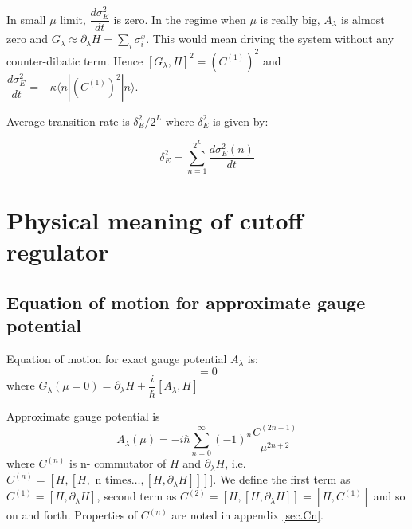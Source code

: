 \documentclass[11pt,a4paper]{article}
\begin{document}
In small $\mu$ limit,  $ \dfrac{d \sigma^2_E}{dt}$ is zero. In  the regime when $\mu$ is really big, $A_{\lambda}$ is almost zero and  $ G_{\lambda} \approx \partial_{\lambda} H = \sum_i \sigma_i^x$.  This would mean driving the system without any counter-dibatic term. Hence $[G_{\lambda}, H]^2= (C^{(1)}) ^2$ and $\dfrac{d \sigma^2_E}{dt}=-\kappa \langle n|(C^{(1)})^2 |n \rangle $.

Average transition rate is $\delta_E^2/2^L$ where $\delta_E^2$ is given by:

\begin{equation}
\delta_E^2= \sum_{n=1}^{2^L}\dfrac{d \sigma^2_E (n)}{dt}
\end{equation}

\section{Physical meaning of cutoff regulator}
\subsection{Equation of motion for approximate gauge potential}
Equation of motion for exact gauge potential $A_{\lambda}$  is:
\begin{equation}
[H, G_{\lambda}(\mu=0)]=0
\end{equation}
where $G_{\lambda}(\mu=0)= \partial_{\lambda} H + \dfrac{i}{\hbar} [A_{\lambda}, H] $ 



Approximate gauge potential is 
\begin{equation}
 A_{\lambda}(\mu) =  -i\hbar \sum_{n=0}^{\infty}   (-1)^{n} \dfrac{ C^{(2n+1)}}{\mu^{2n+2}}
\end{equation}
where $C^{(n)}$ is n- commutator of $H$ and $\partial_{\lambda} H$, i.e. $C^{(n)}= [H, [H, \mbox{ n times} \ldots,[H, \partial_{\lambda} H ]]] ] $.  We define the first term as $C^{(1)}= [H, \partial_{\lambda}H]$, second term as $C^{(2)}= [H,[H, \partial_{\lambda}H]]= [H, C^{(1)}]$ and so on and forth. Properties of $C^{(n)}$ are noted in appendix \ref{sec.Cn}.
\end{document}
